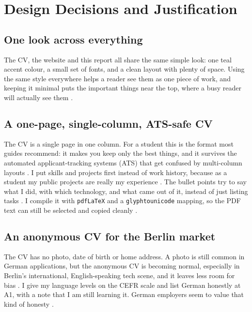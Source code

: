 \documentclass[11pt,a4paper]{article}
\begin{document}
\section{Design Decisions and Justification}
\label{sec:decisions}

\subsection{One look across everything}
The CV, the website and this report all share the same simple look: one teal accent colour, a small set of fonts, and a clean layout with plenty of space. Using the same style everywhere helps a reader see them as one piece of work, and keeping it minimal puts the important things near the top, where a busy reader will actually see them \citep{scrimbaPortfolio, pestoPortfolio}.

\subsection{A one-page, single-column, ATS-safe CV}
The CV is a single page in one column. For a student this is the format most guides recommend: it makes you keep only the best things, and it survives the automated applicant-tracking systems (ATS) that get confused by multi-column layouts \citep{techinterviewhandbook, jobshinobi2026}. I put skills and projects first instead of work history, because as a student my public projects are really my experience \citep{uwcareers2025}. The bullet points try to say what I did, with which technology, and what came out of it, instead of just listing tasks \citep{igotanoffer, beamjobs2026}. I compile it with \texttt{pdfLaTeX} and a \texttt{glyphtounicode} mapping, so the PDF text can still be selected and copied cleanly \citep{jakesresume, atsresumeai}.

\subsection{An anonymous CV for the Berlin market}
The CV has no photo, date of birth or home address. A photo is still common in German applications, but the anonymous CV is becoming normal, especially in Berlin's international, English-speaking tech scene, and it leaves less room for bias \citep{cvcompose2026}. I give my language levels on the CEFR scale and list German honestly at A1, with a note that I am still learning it. German employers seem to value that kind of honesty \citep{goetheCV, werkstudent2026}.
\end{document}
